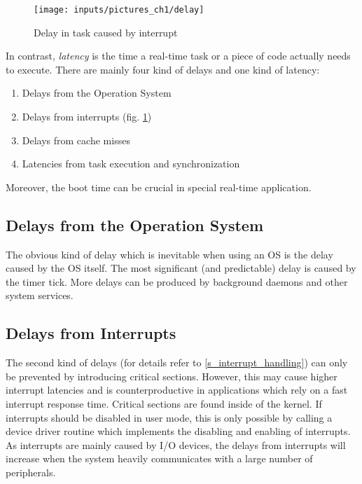 \begin{figure}[htb]
	\begin{center}
		\texttt{[image: inputs/pictures\_ch1/delay]}
	\end{center}
	\caption[Delay in task caused by interrupt]{Delay in task caused by interrupt} \label{fig_delay}
\end{figure}

In contrast, \textit{latency} is the time a real-time task or a piece of code actually needs to execute. 
There are mainly four kind of delays and one kind of latency:
\begin{enumerate}
	\item Delays from the Operation System
	\item Delays from interrupts (fig. \ref{fig_delay})
	\item Delays from cache misses
	\item Latencies from task execution and synchronization
\end{enumerate}
Moreover, the boot time can be crucial in special real-time application.

\subsection{Delays from the Operation System}
The obvious kind of delay which is inevitable when using an \ac{OS} is the delay caused by the \ac{OS} itself.
The most significant (and predictable) delay is caused by the timer tick.
More delays can be produced by background daemons and other system services. 

\subsection{Delays from Interrupts}
The second kind of delays (for details refer to \ref{s_interrupt_handling}) can only be prevented by introducing critical sections. 
However, this may cause higher interrupt latencies and is counterproductive in applications which rely on a fast interrupt response time.
Critical sections are found inside of the kernel.
If interrupts should be disabled in user mode, this is only possible by calling a device driver routine which implements the disabling and enabling of interrupts.  
As interrupts are mainly caused by \ac{I/O} devices, the delays from interrupts will increase when the system heavily communicates with a large number of peripherals. 

